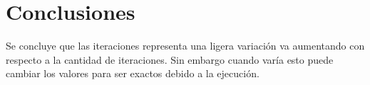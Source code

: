 \documentclass{article}
\begin{document}
\section{Conclusiones}
Se concluye que las iteraciones representa una ligera variación va aumentando con respecto a la cantidad de iteraciones. Sin embargo cuando varía esto puede cambiar los valores para ser exactos debido a la ejecución.



\cite{1}
\cite{2}
\cite{Matpltlib}

\end{document}
